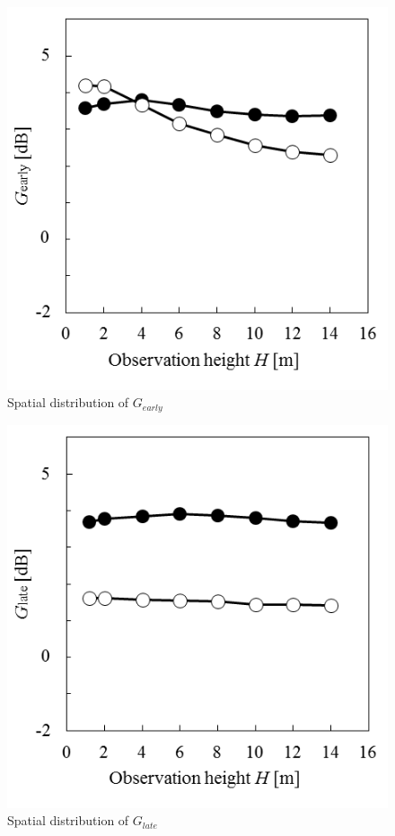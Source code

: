 \begin{figure}[htbp]
    \centering
    \includegraphics[keepaspectratio,scale=1]{04_att/Ge.png}
    \caption{\hspace{1mm}Spatial distribution of $G_{early}$}
    \label{fig:Ge}
\end{figure}

\begin{figure}[htbp]
    \centering
    \includegraphics[keepaspectratio,scale=1]{04_att/Gl.png}
    \caption{\hspace{1mm}Spatial distribution of $G_{late}$}
    \label{fig:Gl}
\end{figure}

